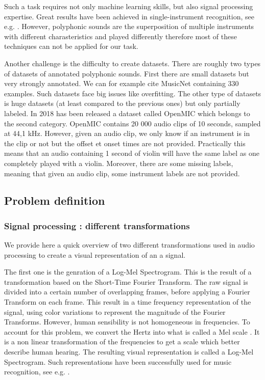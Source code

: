 \documentclass[final]{cvpr}
\begin{document}
Such a task requires not only machine learning skills, but also signal processing expertise. Great results have been achieved in single-instrument recognition, see e.g. \cite{mir}. However, polyphonic sounds are the superposition of multiple instruments with different charasteristics and played differently therefore most of these techniques can not be applied for our task.

Another challenge is the difficulty to create datasets. There are roughly two types of datasets of annotated polyphonic sounds. First there are small datasets but very strongly annotated. We can for example cite MusicNet \cite{MusicNet} containing 330 examples. Such datasets face big issues like overfitting. The other type of datasets is huge datasets (at least compared to the previous ones) but only partially labeled. In 2018 has been released a dataset called OpenMIC \cite{MIC} which belongs to the second category. OpenMIC contains 20 000 audio clips of 10 seconds, sampled at 44,1 kHz. However, given an audio clip, we only know if an instrument is in the clip or not but the offset et onset times are not provided. Practically this means that an audio containing 1 second of violin will have the same label as one completely played with a violin. Moreover, there are some missing labels, meaning that given an audio clip, some instrument labels are not provided. 
\subsection{Problem definition}
\subsubsection{Signal processing : different transformations}
We provide here a quick overview of two different transformations used in audio processing to create a visual representation of an a signal.

The first one is the genration of a Log-Mel Spectrogram. This is the result of a transformation based on the Short-Time Fourier Transform. The raw signal is divided into a certain number of overlapping frames, before applying a Fourier Transform on each frame. This result in a time frequency representation of the signal, using color variations to represent the magnitude of the Fourier Transforms. However, human sensibility is not homogeneous in frequencies. To account for this problem, we convert the Hertz into what is called a Mel scale \cite{mel}. It is a non linear transformation of the frequencies to get a scale which better describe human hearing. The resulting visual representation is called a Log-Mel Spectrogram. Such representations have been successfully used for music recognition, see e.g. \cite{spectrogram}.
\end{document}
